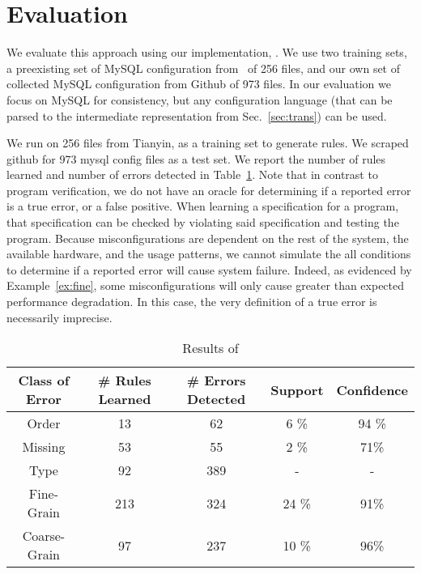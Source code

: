 
\section{Evaluation}

We evaluate this approach using our implementation, \app.
We use two training sets, a preexisting set of MySQL configuration from~\cite{xu15systems} of 256 files,
 and our own set of collected MySQL configuration from Github of 973 files.
In our evaluation we focus on MySQL for consistency, but any configuration language (that can be parsed to the intermediate representation from Sec.~\ref{sec:trans}) can be used.

We run \app on 256 files from Tianyin, as a training set to generate rules.
We scraped github for 973 mysql config files as a test set.
We report the number of rules learned and number of errors detected in Table~\ref{table:learning}.
Note that in contrast to program verification, we do not have an oracle for determining if a reported error is a true error, or a false positive.
When learning a specification for a program, that specification can be checked by violating said specification and testing the program.
Because misconfigurations are dependent on the rest of the system, the available hardware, and the usage patterns, we cannot simulate the all conditions to determine if a reported error will cause system failure.
Indeed, as evidenced by Example~\ref{ex:fine}, some misconfigurations will only cause greater than expected performance degradation.
In this case, the very definition of a true error is necessarily imprecise.

\begin{table}[h]
\centering
\caption{Results of \app}
\label{table:learning}
\setlength{\tabcolsep}{0.5em}
\begin{tabular}{|c|c|c|c|c|}
\hline
{\bf Class of Error } & {\bf \# Rules Learned} & {\bf \# Errors Detected} & {\bf Support} & {\bf Confidence}\\ 
\hline
\hline
Order        & 13  & 62   & 6 \% & 94 \% \\ 
Missing      & 53  & 55   & 2 \%  & 71\% \\ 
Type         & 92  & 389  & -  & -  \\ 
Fine-Grain   & 213 & 324  & 24 \% & 91\%  \\ 
Coarse-Grain & 97  & 237  & 10 \% & 96\% \\ 
\hline 
\end{tabular}
\end{table}

